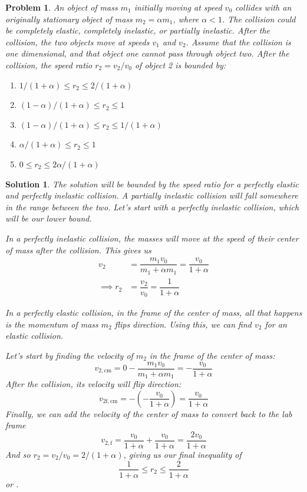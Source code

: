 \documentclass[12pt]{article}
\newcommand{\clearpts}{\addtocounter{tpts}{\value{cpts}} \setcounter{cpts}{0}}
\newcommand{\pts}[1]{\clearpts \setcounter{cpts}{#1}}
\newtheorem*{solution}{Solution}
\theoremstyle{mystyle}
\newtheorem{pproblem}{Problem}
\begin{document}
\pts{2}
\begin{pproblem}
    An object of mass $m_1$ initially moving at speed $v_0$ collides with
    an originally stationary object of mass $m_2 = \alpha m_1$, where
    $\alpha < 1$. The collision could be completely elastic, completely
    inelastic, or partially inelastic. After the collision, the two
    objects move at speeds $v_1$ and $v_2$. Assume that the
    collision is one dimensional, and that object one cannot pass
    through object two. After the collision, the speed ratio
    $r_2 = v_2/v_0$ of object 2 is bounded by:
    \begin{enumerate}[label=\Alph*)]
        \item $1/(1+\alpha)\le r_2 \le 2/(1+\alpha)$
        \item $(1-\alpha)/(1+\alpha)\le r_2\le 1$
        \item $(1-\alpha)/(1+\alpha)\le r_2\le 1/(1+\alpha)$
        \item $\alpha/(1+\alpha)\le r_2\le 1$
        \item $0\le r_2 \le 2\alpha/(1+\alpha)$
    \end{enumerate}
\end{pproblem}
\begin{solution}
    The solution will be bounded by the speed ratio for a perfectly elastic
    and perfectly inelastic collision. A partially inelastic collision
    will fall somewhere in the range between the two. Let's start with a
    perfectly inelastic collision, which will be our lower bound.

    In a perfectly inelastic collision, the masses will move at the speed
    of their center of mass after the collision. This gives us
    \begin{align*}
        v_2&=\dfrac{m_1v_0}{m_1+\alpha m_1}=\dfrac{v_0}{1+\alpha}\\
        \implies r_2&=\dfrac{v_2}{v_0}=\dfrac{1}{1+\alpha}
    \end{align*}

    In a perfectly elastic collision, in the frame of the center of mass,
    all that happens is the momentum of mass $m_2$ flips direction. Using this, we can find $v_2$ for an elastic collision.
    
    Let's start by finding the velocity of $m_2$ in the frame of the center of mass: \[
        v_\mathrm{2,cm}=0-\dfrac{m_1v_0}{m_1+\alpha m_1}=-\dfrac{v_0}{1+\alpha}
    \]
    After the collision, its velocity will flip direction: \[
        v_\mathrm{2f,cm}=-\left(-\dfrac{v_0}{1+\alpha}\right)=\dfrac{v_0}{1+\alpha}
    \]
    Finally, we can add the velocity of the center of mass to convert back
    to the lab frame
    \[
        v_\mathrm{2,f}=\dfrac{v_0}{1+\alpha}
            +\dfrac{v_0}{1+\alpha}=\dfrac{2v_0}{1+\alpha}
    \]
    And so $r_2=v_2/v_0=2/(1+\alpha)$, giving us our final inequality of \[
        \dfrac{1}{1+\alpha}\le r_2 \le \dfrac{2}{1+\alpha}
    \] or .
\end{solution}
\end{document}
